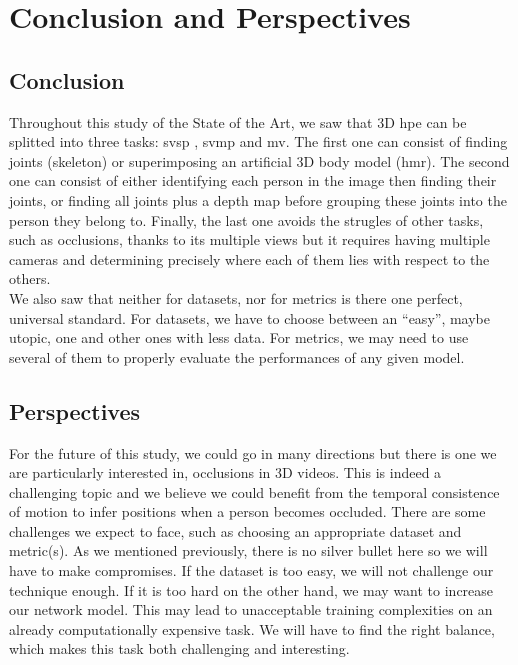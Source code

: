\documentclass[runningheads]{llncs}
\begin{document}
\section{Conclusion and Perspectives}
\subsection{Conclusion}
Throughout this study of the State of the Art, we saw that 3D \ac{hpe} can be splitted into three tasks: \ac{svsp} , \ac{svmp} and \ac{mv}. The first one can consist of finding joints (skeleton) or superimposing an artificial 3D body model (\ac{hmr}). The second one can consist of either identifying each person in the image then finding their joints, or finding all joints plus a depth map before grouping these joints into the person they belong to. Finally, the last one avoids the strugles of other tasks, such as occlusions, thanks to its multiple views but it requires having multiple cameras and determining precisely where each of them lies with respect to the others. \\
We also saw that neither for datasets, nor for metrics is there one perfect, universal standard. For datasets, we have to choose between an ``easy'', maybe utopic, one and other ones with less data. For metrics, we may need to use several of them to properly evaluate the performances of any given model.


\subsection{Perspectives}
For the future of this study, we could go in many directions but there is one we are particularly interested in, occlusions in 3D videos. This is indeed a challenging topic and we believe we could benefit from the temporal consistence of motion to infer positions when a person becomes occluded. There are some challenges we expect to face, such as choosing an appropriate dataset and metric(s). As we mentioned previously, there is no silver bullet here so we will have to make compromises. If the dataset is too easy, we will not challenge our technique enough. If it is too hard on the other hand, we may want to increase our network model. This may lead to unacceptable training complexities on an already computationally expensive task. We will have to find the right balance, which makes this task both challenging and interesting.
\end{document}
